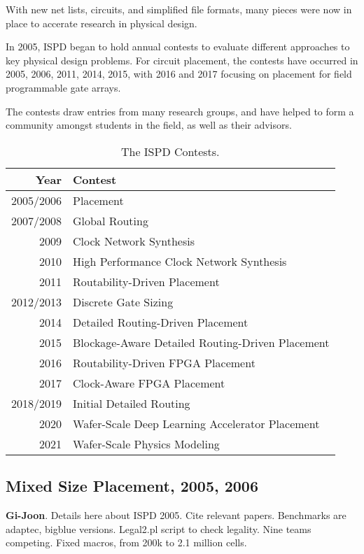 \documentclass[sigconf]{acmart}
\begin{document}
With new net lists, circuits, and simplified file formats,
many pieces were now in place to accerate research
in physical design.  

In 2005, ISPD began to hold annual contests to evaluate different
approaches to key physical design problems.  For circuit placement,
the contests have occurred in 2005, 2006, 2011, 2014, 2015, with 2016
and 2017 focusing on placement for field programmable gate arrays.

The contests draw entries from many research groups, and have
helped to form a community amongst students in the field, as
well as their advisors.  

\begin{table}
  \begin{tabular}{|r|l|}\hline
    Year & Contest \\ \hline
    2005/2006 & Placement \\ \hline
    2007/2008 & Global Routing \\ \hline
    2009 & Clock Network Synthesis \\ \hline    
    2010 & High Performance Clock Network Synthesis \\ \hline    
    2011 & Routability-Driven Placement \\ \hline
    2012/2013 & Discrete Gate Sizing \\ \hline
    2014 & Detailed Routing-Driven Placement \\ \hline    
    2015 & Blockage-Aware Detailed Routing-Driven Placement \\ \hline
    2016 & Routability-Driven FPGA Placement \\ \hline
    2017 & Clock-Aware FPGA Placement \\ \hline    
    2018/2019 & Initial Detailed Routing \\ \hline    
    2020 & Wafer-Scale Deep Learning Accelerator Placement \\ \hline
    2021 & Wafer-Scale Physics Modeling \\ \hline
  \end{tabular}
  \caption{The ISPD Contests.}
  \label{tab:ispdcontest}
\end{table}

\subsection{Mixed Size Placement, 2005, 2006}

{\bf Gi-Joon}.  
\cite{ISPD05_contest}
Details here about ISPD 2005.  Cite relevant papers.
Benchmarks are adaptec, bigblue versions.  Legal2.pl script to
check legality.  Nine teams competing.
Fixed macros, from 200k to 2.1 million cells.
\end{document}

